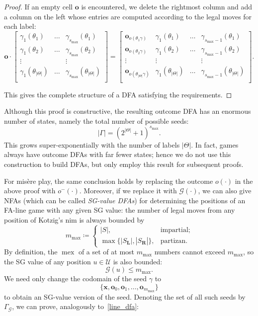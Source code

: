 \documentclass[11pt]{article}
\theoremstyle{definition}
\theoremstyle{plain}
\newcommand{\rmL}{\mathbf{L}}
\newcommand{\rmR}{\mathbf{R}}
\newcommand{\x}{\mathbf{x}}
\newcommand{\e}{\mathbf{o}}
\newcommand{\varG}{\mathcal{G}}
\newcommand{\varU}{\mathcal{U}}
\newcommand{\mex}{\operatorname{mex}}
\begin{document}
\begin{proof}
    If an empty cell $\e$ is encountered, we delete the rightmost column and add a column on the left whose entries are computed according to the legal moves for each label:
    \[
        \e\cdot
        \begin{bmatrix}
            \gamma_1(\theta_1) & \ldots & \gamma_{s_{\max}}(\theta_1) \\
            \gamma_1(\theta_2) & \ldots & \gamma_{s_{\max}}(\theta_2) \\
            \vdots & & \vdots \\
            \gamma_1(\theta_{|\varTheta|}) & \ldots & \gamma_{s_{\max}}(\theta_{|\varTheta|}) \\
        \end{bmatrix}
        =
        \begin{bmatrix}
            \e_{o(\theta_1 \gamma)} & \gamma_1(\theta_1) & \ldots & \gamma_{s_{\max}-1}(\theta_1) \\
            \e_{o(\theta_2 \gamma)} & \gamma_1(\theta_2) & \ldots & \gamma_{s_{\max}-1}(\theta_2) \\
            \vdots & \vdots & & \vdots \\
            \e_{o(\theta_{|\varTheta|} \gamma)} & \gamma_1(\theta_{|\varTheta|}) & \ldots & \gamma_{s_{\max}-1}(\theta_{|\varTheta|}) \\
        \end{bmatrix}.
    \]

    This gives the complete structure of a DFA satisfying the requirements.
\end{proof}

Although this proof is constructive, the resulting outcome DFA has an enormous number of states, namely the total number of possible seeds:
\[
    |\varGamma|=(2^{|\varTheta|}+1)^{s_{\max}}.
\]
This grows super-exponentially with the number of labels $|\varTheta|$.
In fact, games always have outcome DFAs with far fewer states; hence we do not use this construction to build DFAs, but only employ this result for subsequent proofs.

For misère play, the same conclusion holds by replacing the outcome $o(\cdot)$ in the above proof with $o^-(\cdot)$.
Moreover, if we replace it with $\varG(\cdot)$, we can also give NFAs (which can be called \textit{SG-value DFAs}) for determining the positions of an FA-line game with any given SG value:
the number of legal moves from any position of Kotzig's nim is always bounded by
\[
    m_{\max} \coloneq
    \begin{cases}
        |S|,                            & \text{impartial}; \\
        \max\{|S_{\rmL}|, |S_{\rmR}|\}, & \text{partizan}.
    \end{cases}
\]
By definition, the $\mex$ of a set of at most $m_{\max}$ numbers cannot exceed $m_{\max}$, so the SG value of any position $u\in\varU$ is also bounded:
\[
    \varG(u) \leq m_{\max}.
\]
We need only change the codomain of the seed $\gamma$ to
\[
    \{\x, \e_0, \e_1, \ldots, \e_{m_{\max}}\}
\]
to obtain an SG-value version of the seed.
Denoting the set of all such seeds by $\varGamma_{\varG}$, we can prove, analogously to~\ref{line_dfa}:
\end{document}
